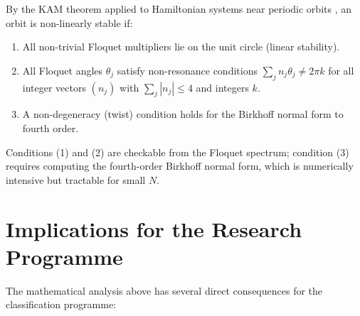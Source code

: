 \documentclass[12pt, a4paper]{article}
\theoremstyle{plain}
\theoremstyle{definition}
\begin{document}
By the KAM theorem applied to Hamiltonian systems near periodic
orbits \cite{Moser1962}, an orbit is non-linearly stable if:
\begin{enumerate}[leftmargin=1.8em]
  \item All non-trivial Floquet multipliers lie on the unit circle
        (linear stability).
  \item All Floquet angles $\theta_j$ satisfy non-resonance conditions
        $\sum_j n_j \theta_j \neq 2\pi k$ for all integer vectors
        $(n_j)$ with $\sum_j |n_j| \leq 4$ and integers $k$.
  \item A non-degeneracy (twist) condition holds for the
        Birkhoff normal form to fourth order.
\end{enumerate}
Conditions (1) and (2) are checkable from the Floquet spectrum;
condition (3) requires computing the fourth-order Birkhoff normal form,
which is numerically intensive but tractable for small $N$.

\section{Implications for the Research Programme}

The mathematical analysis above has several direct consequences for
the classification programme:
\end{document}
